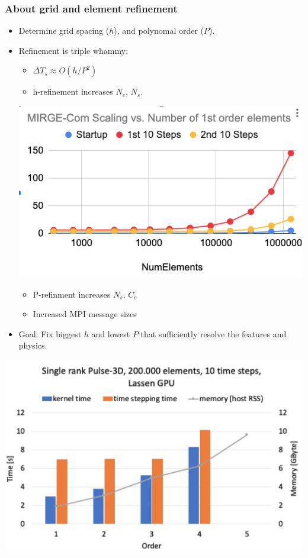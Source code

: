 \begin{frame}\frametitle{About grid and element refinement}
\begin{multicols}{2}
\begin{itemize}
\item Determine grid spacing ($h$), and polynomal order ($P$).
\item Refinement is triple whammy:
\begin{itemize}
\item $\Delta{T_s} \approx O(h / P^2)$
\item h-refinement increases $N_e$, $N_s$.
\end{itemize}
\hspace{-20pt}\includegraphics[width=.45\textwidth]{figures/scaling_nelements2.png}
\columnbreak
\begin{itemize}
\item P-refinment increases $N_s$, $C_e$
\item Increased MPI message sizes
\end{itemize}
\item Goal: Fix biggest $h$ and lowest $P$ that sufficiently resolve the features and physics.
\end{itemize}
\includegraphics[width=.5\textwidth]{figures/prefinement_impact.png}\\
\begin{center}
\vspace{-15pt}
\end{center}
\end{multicols}
\end{frame}

